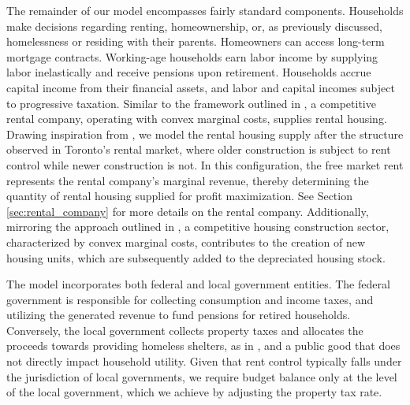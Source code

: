 \documentclass[parskip=full]{article}
\begin{document}
The remainder of our model encompasses fairly standard components. Households make decisions regarding renting, homeownership, or, as previously discussed, homelessness or residing with their parents. Homeowners can access long-term mortgage contracts. Working-age households earn labor income by supplying labor inelastically and receive pensions upon retirement. Households accrue capital income from their financial assets, and labor and capital incomes subject to progressive taxation. Similar to the framework outlined in \citet{garrigaeetal-2009}, a competitive rental company, operating with convex marginal costs, supplies rental housing. Drawing inspiration from \citet{fallis-1985}, we model the rental housing supply after the structure observed in Toronto's rental market, where older construction is subject to rent control while newer construction is not. In this configuration, the free market rent represents the rental company's marginal revenue, thereby determining the quantity of rental housing supplied for profit maximization. See Section \ref{sec:rental_company} for more details on the rental company. Additionally, mirroring the approach outlined in \citet{rotberg-2022}, a competitive housing construction sector, characterized by convex marginal costs, contributes to the creation of new housing units, which are subsequently added to the depreciated housing stock.

The model incorporates both federal and local government entities. The federal government is responsible for collecting consumption and income taxes, and utilizing the generated revenue to fund pensions for retired households. Conversely, the local government collects property taxes and allocates the proceeds towards providing homeless shelters, as in \citet{abramson-2024}, and a public good that does not directly impact household utility. Given that rent control typically falls under the jurisdiction of local governments, we require budget balance only at the level of the local government, which we achieve by adjusting the property tax rate.
\end{document}
